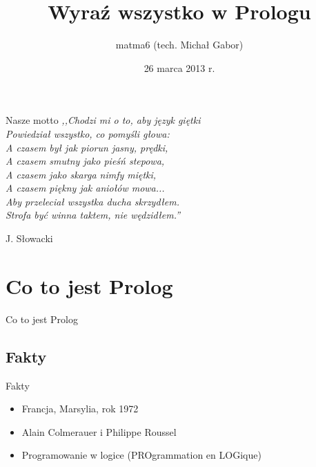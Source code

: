 \documentclass[blue]{beamer}
\author{matma6 (tech. Michał Gabor)}
\title{Wyraź wszystko w Prologu}
\date{26 marca 2013 r.}
\newcommand{\tytul}[1]{\begin{frame}\begin{center}\begin{Huge}#1\end{Huge}\end{center}\end{frame}}
\begin{document}
\begin{frame}
\titlepage
\end{frame}
\begin{frame}{Nasze motto}
\textit{,,Chodzi mi o to, aby język giętki\\Powiedział wszystko, co pomyśli głowa:\\A czasem był jak piorun jasny, prędki,\\A czasem smutny jako pieśń stepowa,\\A czasem jako skarga nimfy miętki,\\A czasem piękny jak aniołów mowa...\\Aby przeleciał wszystka ducha skrzydłem.\\Strofa być winna taktem, nie wędzidłem.''}
\begin{flushright}
J. Słowacki
\end{flushright}
\end{frame}
\begin{frame}
\tableofcontents
\end{frame}
\section{Co to jest Prolog}
\tytul{Co to jest Prolog}
\subsection{Fakty}
\begin{frame}{Fakty}
\begin{itemize}
\item Francja, Marsylia, rok 1972
\item Alain Colmerauer i Philippe Roussel
\item Programowanie w logice (PROgrammation en LOGique)
\end{itemize}
\end{frame}
\end{document}
